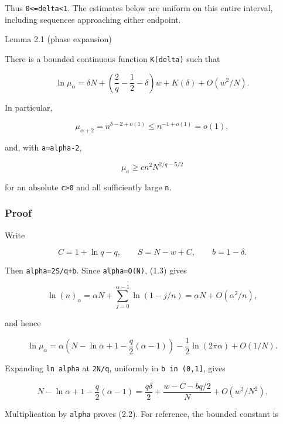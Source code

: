 \documentclass[
  11pt,
  a4paper,
]{article}
\begin{document}
Thus \texttt{0\textless{}=delta\textless{}1}. The estimates below are
uniform on this entire interval, including sequences approaching either
endpoint.

{}
\label{lemma-2.1-phase-expansion}
\begin{lemmabox}{Lemma 2.1 (phase expansion)}

There is a bounded continuous function \texttt{K(delta)} such that

\[
 \ln\mu_\alpha
 =\delta N+\left(\frac2q-\frac12-\delta\right)w
   +K(\delta)+O(w^2/N).                                  \tag{2.2}
\]

In particular,

\[
 \mu_{\alpha+2}=n^{\delta-2+o(1)}
 \le n^{-1+o(1)}=o(1),                                   \tag{2.3}
\]

and, with \texttt{a=alpha-2},

\[
 \mu_a\ge c n^2N^{2/q-5/2}                              \tag{2.4}
\]

for an absolute \texttt{c\textgreater{}0} and all sufficiently large
\texttt{n}.

\end{lemmabox}

\subsubsection{Proof}\label{proof}

Write

\[
 C=1+\ln q-q,\qquad S=N-w+C,\qquad b=1-\delta.
\]

Then \texttt{alpha=2S/q+b}. Since \texttt{alpha=O(N)}, (1.3) gives

\[
 \ln(n)_\alpha=\alpha N+
 \sum_{j=0}^{\alpha-1}\ln(1-j/n)
 =\alpha N+O(\alpha^2/n),
\]

and hence

\[
 \ln\mu_\alpha
 =\alpha\left(N-\ln\alpha+1-\frac q2(\alpha-1)\right)
  -\frac12\ln(2\pi\alpha)+O(1/N).                       \tag{2.5}
\]

Expanding \texttt{ln\ alpha} at \texttt{2N/q}, uniformly in
\texttt{b\ in\ (0,1{]}}, gives

\[
 N-\ln\alpha+1-\frac q2(\alpha-1)
 =\frac{q\delta}{2}
  +\frac{w-C-bq/2}{N}+O(w^2/N^2).                        \tag{2.6}
\]

Multiplication by \texttt{alpha} proves (2.2). For reference, the
bounded constant is
\end{document}
